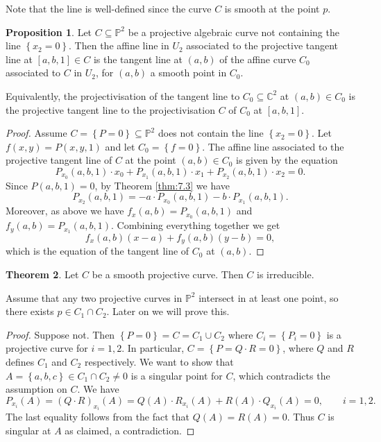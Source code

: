 \documentclass{article}
\newcommand{\C}{\mathbb{C}}
\renewcommand{\P}{\mathbb{P}}
\newcommand{\rb}[1]{\left( #1 \right)}
\renewcommand{\sb}[1]{\left[ #1 \right]}
\newcommand{\cb}[1]{\left\{ #1 \right\}}
\theoremstyle{definition}\newtheorem{definition}{Definition}[section]
\theoremstyle{definition}\newtheorem{notation}[definition]{Notation}
\theoremstyle{definition}\newtheorem{remark}[definition]{Remark}
\theoremstyle{definition}\newtheorem{example}[definition]{Example}
\theoremstyle{definition}\newtheorem{fact}{Fact}
\theoremstyle{definition}\newtheorem{exercise}{Exercise}
\newtheorem{proposition}[definition]{Proposition}
\newtheorem{theorem}[definition]{Theorem}
\begin{document}
Note that the line is well-defined since the curve $ C $ is smooth at the point $ p $.

\begin{proposition}
Let $ C \subseteq \P^2 $ be a projective algebraic curve not containing the line $ \cb{x_2 = 0} $. Then the affine line in $ U_2 $ associated to the projective tangent line at $ \sb{a, b, 1} \in C $ is the tangent line at $ \rb{a, b} $ of the affine curve $ C_0 $ associated to $ C $ in $ U_2 $, for $ \rb{a, b} $ a smooth point in $ C_0 $.
\end{proposition}

Equivalently, the projectivisation of the tangent line to $ C_0 \subseteq \C^2 $ at $ \rb{a, b} \in C_0 $ is the projective tangent line to the projectivisation $ C $ of $ C_0 $ at $ \sb{a, b, 1} $.

\begin{proof}
Assume $ C = \cb{P = 0} \subseteq \P^2 $ does not contain the line $ \cb{x_2 = 0} $. Let $ f\rb{x, y} = P\rb{x, y, 1} $ and let $ C_0 = \cb{f = 0} $. The affine line associated to the projective tangent line of $ C $ at the point $ \rb{a, b} \in C_0 $ is given by the equation
$$ P_{x_0}\rb{a, b, 1} \cdot x_0 + P_{x_1}\rb{a, b, 1} \cdot x_1 + P_{x_2}\rb{a, b, 1} \cdot x_2 = 0. $$
Since $ P\rb{a, b, 1} = 0 $, by Theorem \ref{thm:7.3} we have
$$ P_{x_2}\rb{a, b, 1} = -a \cdot P_{x_0}\rb{a, b, 1} - b \cdot P_{x_1}\rb{a, b, 1}. $$
Moreover, as above we have $ f_x\rb{a, b} = P_{x_0}\rb{a, b, 1} $ and $ f_y\rb{a, b} = P_{x_1}\rb{a, b, 1} $. Combining everything together we get
$$ f_x\rb{a, b}\rb{x - a} + f_y\rb{a, b}\rb{y - b} = 0, $$
which is the equation of the tangent line of $ C_0 $ at $ \rb{a, b} $.
\end{proof}

\begin{theorem}
\label{thm:7.9}
Let $ C $ be a smooth projective curve. Then $ C $ is irreducible.
\end{theorem}

Assume that any two projective curves in $ \P^2 $ intersect in at least one point, so there exists $ p \in C_1 \cap C_2 $. Later on we will prove this.

\begin{proof}
Suppose not. Then $ \cb{P = 0} = C = C_1 \cup C_2 $ where $ C_i = \cb{P_i = 0} $ is a projective curve for $ i = 1, 2 $. In particular, $ C = \cb{P = Q \cdot R = 0} $, where $ Q $ and $ R $ defines $ C_1 $ and $ C_2 $ respectively. We want to show that $ A = \cb{a, b, c} \in C_1 \cap C_2 \ne 0 $ is a singular point for $ C $, which contradicts the assumption on $ C $. We have
$$ P_{x_i}\rb{A} = \rb{Q \cdot R}_{x_i}\rb{A} = Q\rb{A} \cdot R_{x_i}\rb{A} + R\rb{A} \cdot Q_{x_i}\rb{A} = 0, \qquad i = 1, 2. $$
The last equality follows from the fact that $ Q\rb{A} = R\rb{A} = 0 $. Thus $ C $ is singular at $ A $ as claimed, a contradiction.
\end{proof}
\end{document}
